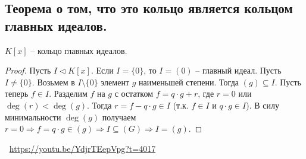 \subsection{Теорема о том, что это кольцо является кольцом главных идеалов.}
\begin{theorem}
    $K[x]$ -- кольцо главных идеалов.
    \begin{proof}
        Пусть $I \triangleleft K[x]$. Если $I = \{0\}$, то $I = (0)$ -- главный идеал. Пусть $I \neq \{0\}$. Возьмем в $I \setminus \{0\}$ элемент $g$ наименьшей степени. Тогда $(g) \subseteq I$. Пусть теперь $f \in I$. Разделим $f$ на $g$ с остатком $f = q \cdot g + r$, где $r = 0$ или $\deg(r) < \deg(g)$. Тогда $r = f - q \cdot g \in I$ (т.к. $f \in I$ и $q \cdot g \in I$). В силу минимальности $\deg(g)$ получаем $r = 0 \Rightarrow f = q \cdot g \in (g) \Rightarrow I \subseteq (G) \Rightarrow I = (g)$.
    \end{proof}
\end{theorem}
\large \faYoutube \normalsize $\>$ \url{https://youtu.be/YdjrTEepVpg?t=4017}